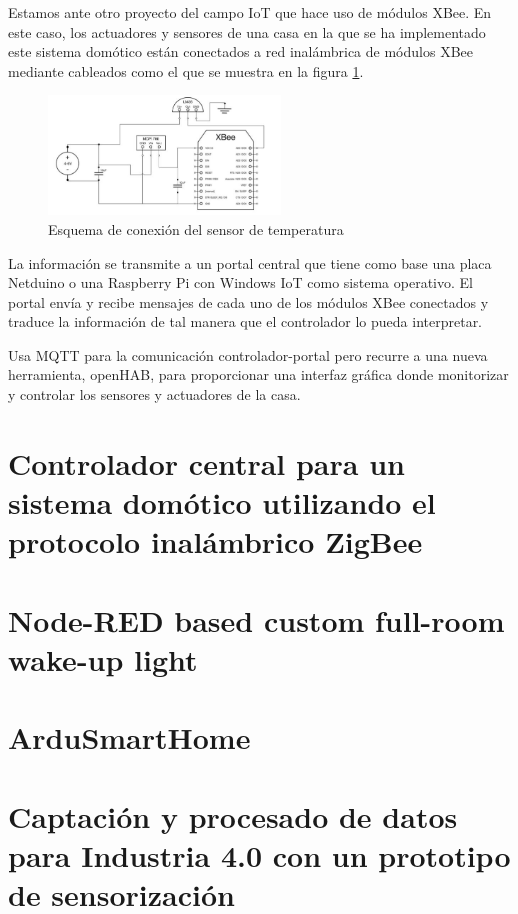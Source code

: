 Estamos ante otro proyecto del campo IoT que hace uso de módulos XBee. En este caso, los actuadores y sensores de una casa en la que se ha implementado este sistema domótico están conectados a red inalámbrica de módulos XBee mediante cableados como el que se muestra en la figura \ref{fig:EArte5}.

\begin{figure}[tb]
\centering
\includegraphics[width=0.55\textwidth]{figuras/EArte5.png}
\caption{Esquema de conexión del sensor de temperatura}
\label{fig:EArte5}
\end{figure}

La información se transmite a un portal central que tiene como base una placa Netduino o una Raspberry Pi con Windows IoT como sistema operativo. El portal envía y recibe mensajes de cada uno de los módulos XBee conectados y traduce la información de tal manera que el controlador lo pueda interpretar.

Usa MQTT para la comunicación controlador-portal pero recurre a una nueva herramienta, openHAB, para proporcionar una interfaz gráfica donde monitorizar y controlar los sensores y actuadores de la casa.

\section{Controlador central para un sistema domótico utilizando el protocolo inalámbrico ZigBee \cite{ULL:2016}}

\section{Node-RED based custom full-room wake-up light \cite{Bulten:2019}}

\section{ArduSmartHome \cite{UOC:2017}}

\section{Captación y procesado de datos para Industria 4.0 con un prototipo de sensorización \cite{UAH:2018}}